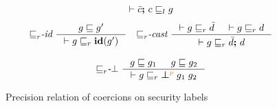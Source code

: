 \begin{figure}[tbp]
{\begin{gather*}
              {\vdash \bar{c} \ensuremath{\boldsymbol{;}\,}c \sqsubseteq_l g}
  \end{gather*}}
 {\small
  \begin{gather*}
    {\sqsubseteq}_r\textit{-id} ~
    \inference{g \sqsubseteq g'}
              {\vdash g \sqsubseteq_r \id{g'}}
    \quad
    {\sqsubseteq}_r\textit{-cast} ~
    \inference{\vdash g \sqsubseteq_r \bar{d} & \vdash g \sqsubseteq_r d}
              {\vdash g \sqsubseteq_r \bar{d} \seq d}
    \\[2ex]
    {\sqsubseteq}_r\textit{-}\bot ~
    \inference{g \sqsubseteq g_1 & g \sqsubseteq g_2}
              {\vdash g \sqsubseteq_r \err{g_1}{g_2}{p}}
  \end{gather*}}
  \caption{Precision relation of coercions on security labels}
  \label{fig:cexpr-prec}
\end{figure}

